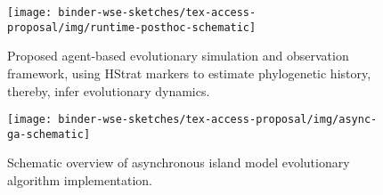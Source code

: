 \begin{figure*}
  \centering
  \begin{subfigure}[t]{0.43\linewidth}
    \centering
  \texttt{[image: binder-wse-sketches/tex-access-proposal/img/runtime-posthoc-schematic]}
    \caption{%
    Proposed agent-based evolutionary simulation and observation framework, using HStrat markers to estimate phylogenetic history, thereby, infer evolutionary dynamics.
    }
    \label{fig:runtime-posthoc-schematic}
  \end{subfigure}
  \hspace{0.07\linewidth}
  \begin{subfigure}[t]{0.43\linewidth}
    \centering
  \texttt{[image: binder-wse-sketches/tex-access-proposal/img/async-ga-schematic]}
    \caption{Schematic overview of asynchronous island model evolutionary algorithm implementation.}
    \label{fig:async-ga-schematic}
  \end{subfigure}

\caption{%
\textbf{Summary of proposed experimental framework.}
Subfigure \ref{fig:runtime-posthoc-schematic} overviews proposed distributed simluation strategy.
Subfigure \ref{fig:async-ga-schematic} summarizes asynchronous population exchange strategy used to simulate evolving populations on Cerebras Wafer Scale Engine hardware.
}
\label{fig:schematic}

\end{figure*}
